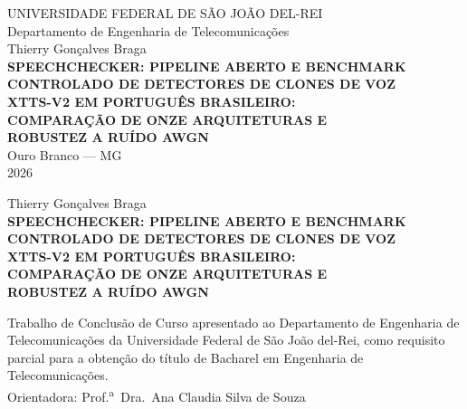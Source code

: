 \documentclass[12pt,a4paper]{article}
\begin{document}
\pagestyle{empty}
\hypersetup{pageanchor=false}

\begin{center}
	{\large UNIVERSIDADE FEDERAL DE SÃO JOÃO DEL-REI}\\[0.3cm]
	{\normalsize Departamento de Engenharia de Telecomunicações}\\[2.0cm]
	
	{\large Thierry Gonçalves Braga}\\[2.0cm]
	
	{\Large\bfseries
		SPEECHCHECKER: PIPELINE ABERTO E BENCHMARK\\[0.3cm]
		CONTROLADO DE DETECTORES DE CLONES DE VOZ\\[0.3cm]
		XTTS-V2 EM PORTUGUÊS BRASILEIRO:\\[0.3cm]
		COMPARAÇÃO DE ONZE ARQUITETURAS E\\[0.3cm]
		ROBUSTEZ A RUÍDO AWGN}\\[5.2cm]
	
	{\normalsize Ouro Branco --- MG\\
		2026}
\end{center}
\newpage

\begin{center}
	{\large Thierry Gonçalves Braga}\\[3.0cm]
	
	{\Large\bfseries
		SPEECHCHECKER: PIPELINE ABERTO E BENCHMARK\\[0.3cm]
		CONTROLADO DE DETECTORES DE CLONES DE VOZ\\[0.3cm]
		XTTS-V2 EM PORTUGUÊS BRASILEIRO:\\[0.3cm]
		COMPARAÇÃO DE ONZE ARQUITETURAS E\\[0.3cm]
		ROBUSTEZ A RUÍDO AWGN}\\[1.7cm]
\end{center}

\hfill\begin{minipage}{8.5cm}
	\begin{singlespace}
		\noindent Trabalho de Conclusão de Curso apresentado ao Departamento de
		Engenharia de Telecomunicações da Universidade Federal de São João del-Rei,
		como requisito parcial para a obtenção do título de Bacharel em Engenharia de
		Telecomunicações.\\[0.5cm]
		Orientadora: Prof.\textsuperscript{a}\ Dra.\ Ana Claudia Silva de Souza
	\end{singlespace}
\end{minipage}
\end{document}
